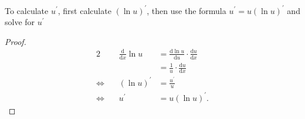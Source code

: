 \begin{enumerate}
        \indent To calculate \(u^\prime\), first calculate \((\ln u)^\prime\), then use the formula \(u^\prime=u(\ln u)^\prime\) and solve for \(u^\prime\)
        \begin{proof}
            \begin{alignat*}{2}
                & & \frac{\mathrm{d}}{\mathrm{d}x}\ln u & =\frac{\mathrm{d}\ln u}{\mathrm{d}u}\cdot\frac{\mathrm{d}u}{\mathrm{d}x}\\
                & & & =\frac{1}{u}\cdot\frac{\mathrm{d}u}{\mathrm{d}x}\\
                \Leftrightarrow\, & & (\ln u)^\prime & =\frac{u^\prime}{u}\\
                \Leftrightarrow\, & & u^\prime & =u(\ln u)^\prime .
            \end{alignat*}
        \end{proof}
\end{enumerate}

